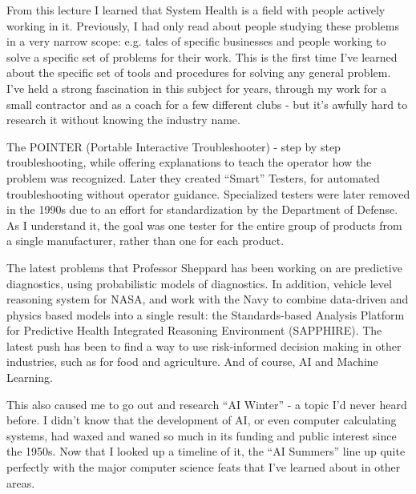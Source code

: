 \documentclass{article}
\begin{document}
From this lecture I learned that System Health is a field with people actively working in it. Previously, I had only read about people studying these problems in a very narrow scope: e.g. tales of specific businesses and people working to solve a specific set of problems for their work. This is the first time I’ve learned about the specific set of tools and procedures for solving any general problem. I’ve held a strong fascination in this subject for years, through my work for a small contractor and as a coach for a few different clubs - but it’s awfully hard to research it without knowing the industry name.
\par The POINTER (Portable Interactive Troubleshooter) - step by step troubleshooting, while offering explanations to teach the operator how the problem was recognized. Later they created “Smart” Testers, for automated troubleshooting without operator guidance. Specialized testers were later removed in the 1990s due to an effort for standardization by the Department of Defense. As I understand it, the goal was one tester for the entire group of products from a single manufacturer, rather than one for each product.
\par The latest problems that Professor Sheppard has been working on are predictive diagnostics, using probabilistic models of diagnostics. In addition, vehicle level reasoning system for NASA, and work with the Navy to combine data-driven and physics based models into a single result: the Standards-based Analysis Platform for Predictive Health Integrated Reasoning Environment (SAPPHIRE). The latest push has been to find a way to use risk-informed decision making in other industries, such as for food and agriculture. And of course, AI and Machine Learning.
\par This also caused me to go out and research “AI Winter” - a topic I’d never heard before. I didn’t know that the development of AI, or even computer calculating systems, had waxed and waned so much in its funding and public interest since the 1950s. Now that I looked up a timeline of it, the “AI Summers” line up quite perfectly with the major computer science feats that I’ve learned about in other areas.
\end{document}
